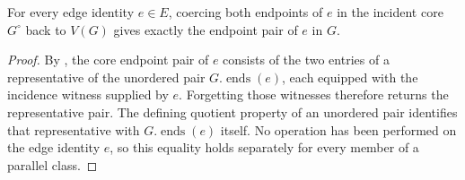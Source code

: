 \begin{lemma}
For every edge identity $e\in E$, coercing both endpoints of $e$ in the
incident core $G^{\circ}$ back to $V(G)$ gives exactly the endpoint pair of
$e$ in $G$.
\end{lemma}
\begin{proof}
By , the core endpoint pair of $e$ consists of the two
entries of a representative of the unordered pair $G.\operatorname{ends}(e)$,
each equipped with the incidence witness supplied by $e$.  Forgetting those
witnesses therefore returns the representative pair.  The defining quotient
property of an unordered pair identifies that representative with
$G.\operatorname{ends}(e)$ itself.  No operation has been performed on the
edge identity $e$, so this equality holds separately for every member of a
parallel class.
\end{proof}
